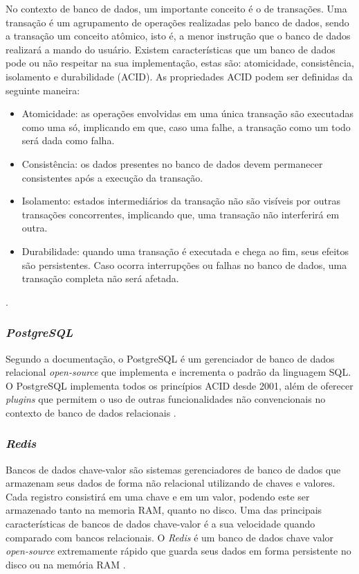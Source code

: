 No contexto de banco de dados, um importante conceito é o de transações. Uma transação é um agrupamento de operações realizadas pelo banco de dados, sendo a transação um conceito atômico, isto é, a menor instrução que o banco de dados realizará a mando do usuário. Existem características que um banco de dados pode ou não respeitar na sua implementação, estas são: atomicidade, consistência, isolamento e durabilidade (ACID). As propriedades ACID podem ser definidas da seguinte maneira:

\begin{itemize}
    \item Atomicidade: as operações envolvidas em uma única transação são executadas como uma só, implicando em que, caso uma falhe, a transação como um todo será dada como falha.
    \item Consistência: os dados presentes no banco de dados devem permanecer consistentes após a execução da transação.
    \item Isolamento: estados intermediários da transação não são visíveis por outras transações concorrentes, implicando que, uma transação não interferirá em outra.
    \item Durabilidade: quando uma transação é executada e chega ao fim, seus efeitos são persistentes. Caso ocorra interrupções ou falhas no banco de dados, uma transação completa não será afetada.
\end{itemize}

\cite{yu2009acid}.

\subsubsection{\textit{PostgreSQL}}

Segundo a documentação, o PostgreSQL é um gerenciador de banco de dados relacional \textit{open-source} que implementa e incrementa o padrão da linguagem SQL. O PostgreSQL implementa todos os princípios ACID desde 2001, além de oferecer \textit{plugins} que permitem o uso de outras funcionalidades não convencionais no contexto de banco de dados relacionais \cite{postgresql_about}.

\subsubsection{\textit{Redis}}

Bancos de dados chave-valor são sistemas gerenciadores de banco de dados que armazenam seus dados de forma não relacional utilizando de chaves e valores. Cada registro consistirá em uma chave e em um valor, podendo este ser armazenado tanto na memoria RAM, quanto no disco. Uma das principais características de bancos de dados chave-valor é a sua velocidade quando comparado com bancos relacionais. O \textit{Redis} é um banco de dados chave valor \textit{open-source} extremamente rápido que guarda seus dados em forma persistente no disco ou na memória RAM \cite{redis-in-action}.

